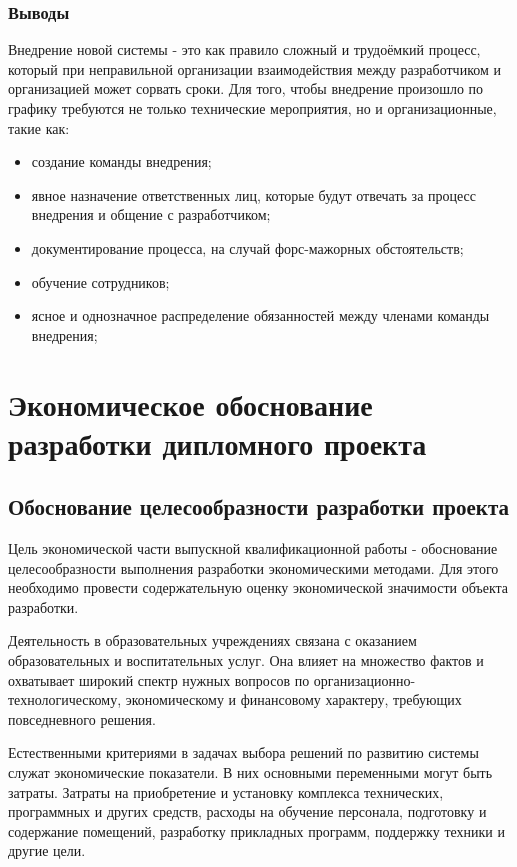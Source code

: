 \documentclass[utf8,usehyperref,12pt]{G7-32}
\begin{document}
\subsection{Выводы}
Внедрение новой системы - это как правило сложный и трудоёмкий процесс, который при неправильной организации взаимодействия между разработчиком и организацией может сорвать сроки. Для того, чтобы внедрение произошло по графику требуются не только технические мероприятия, но и организационные, такие как: 
\begin{itemize}
 \item создание команды внедрения;
 \item явное назначение ответственных лиц, которые будут отвечать за процесс внедрения и общение с разработчиком;
 \item документирование процесса, на случай форс-мажорных обстоятельств;
 \item обучение сотрудников;
 \item ясное и однозначное распределение обязанностей между членами команды внедрения;
\end{itemize}



\chapter{Экономическое обоснование разработки дипломного проекта}
\section{Обоснование целесообразности разработки проекта}

Цель экономической части выпускной квалификационной работы - обоснование целесообразности выполнения разработки экономическими методами. Для этого необходимо провести содержательную оценку экономической значимости объекта разработки.

Деятельность в образовательных учреждениях связана с оказанием образовательных и воспитательных услуг. Она влияет на множество  фактов  и  охватывает широкий спектр нужных вопросов по организационно-технологическому, экономическому и финансовому характеру, требующих повседневного решения.

Естественными критериями в задачах выбора решений по развитию системы служат экономические показатели. В них основными переменными могут быть затраты. Затраты на приобретение и установку комплекса технических, программных и других средств, расходы на обучение персонала, подготовку и содержание помещений, разработку прикладных программ, поддержку техники и другие цели.
\end{document}
